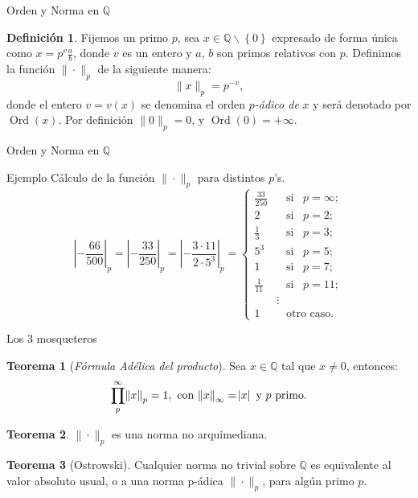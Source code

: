 \documentclass{beamer}
\newcommand{\bb}[1]{\mathbb{#1}}
\theoremstyle{definition}
\numberwithin{equation}{section}
\newcommand{\marine}[1]{\textcolor{defColor}{#1}}
\newcommand{\orangee}[1]{\textcolor{thColor}{#1}}
\newtheorem{df}{\marine{Definición}}
\newtheorem{thh}{\orangee{Teorema}}
\newcommand{\tit}[1]{\textit{#1}}
\newcommand{\Q}{\mathbb{Q}}
\newcommand{\pnorm}[1]{\|#1\|_p}
\DeclareMathOperator{\ord}{Ord}
\begin{document}
\begin{frame}{Orden y Norma en $\Q$}
\begin{df} \label{ord_def_1}
	Fijemos un primo $p$, sea $x\in\mathbb{Q\smallsetminus}\left\{  0\right\}  $ expresado de forma única como $x=p^{v}\frac{a}{b}$, donde $v$ es un entero y
	$a$, $b$ son  primos relativos con $p$.
	Definimos la función $\pnorm{\cdot}$ de la siguiente manera:
	\[
	\| x\| _{p}=p^{-v},
	\]
	donde el entero $v=v\left (  x\right)  $ se denomina el orden $p$\textit{-ádico de} $x$ y
	será denotado por $\ord\left (  x\right)  $. Por definición $\|0\|_p=0$, y  $\ord (0)=+\infty $.
\end{df}
\end{frame}
\begin{frame}{Orden y Norma en $\Q$}
	\begin{exampleblock}{Ejemplo}
		Cálculo de la función $\pnorm{\cdot}$ para distintos $p$'s.
		\[
		\left| -\frac{66}{500}\right| _{p}=\left| -\frac{33}{250}\right| _{p}=\left| -\frac{3\cdot11}{2\cdot5^3}\right| _{p}=\begin{cases}
		\frac{33}{250}       &\,\,\, \text{ si } \,\,\,p=\infty;\\ 
		2                    &\,\,\, \text{ si }\,\,\, p=2;\\
		\frac{1}{3}          &\,\,\, \text{ si } \,\,\,p=3;\\  
		5^3                  &\,\,\, \text{ si }\,\,\, p=5;\\   
		1                    &\,\,\, \text{ si }\,\,\, p=7;\\    
		\frac{1}{11}         & \,\,\,\text{ si }\,\,\, p=11;\\     
		& \vdots\\
		1                   &\,\,\,\text{ otro caso}.
		\end{cases}
		\]
	\end{exampleblock}
\end{frame}
\begin{frame}{Los 3 mosqueteros}
	
	\begin{thh}
		[\tit{Fórmula Adélica del producto}]
		Sea $x\in \bb{Q}$ tal que $x\neq0$, entonces:
		$$\displaystyle\prod_{p}^\infty \norm{x}_p=1, \text{ con } \norm{x}_\infty=\abs{x} \text{ y $p$ primo}.$$
	\end{thh}
\begin{thh}
		$\| \cdot \|_p$ es una norma no arquimediana.	
\end{thh}
\begin{thh}
	[Ostrowski]	\label{ostrowsky} Cualquier norma no trivial sobre $\mathbb{Q}$ es equivalente al
	valor absoluto usual, o a una norma p-ádica $\| \cdot\| _{p}%
	$, para algún primo $p$.
\end{thh}
\end{frame}
\end{document}
